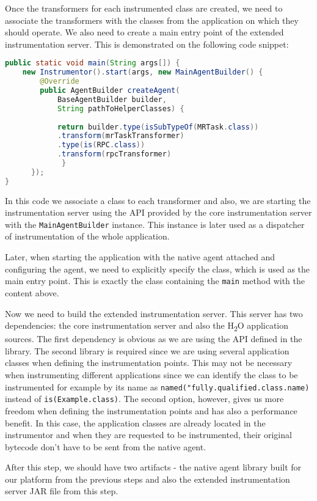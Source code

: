Once the transformers for each instrumented class are created, we need to associate the transformers with the classes from the application on which they should operate. We also need to create a main entry point of the extended instrumentation server. This is demonstrated on the following code snippet:

\begin{lstlisting}[language=Java]
 public static void main(String args[]) {
	new Instrumentor().start(args, new MainAgentBuilder() {
		@Override
		public AgentBuilder createAgent(
			BaseAgentBuilder builder,
			String pathToHelperClasses) {
	 		 
			return builder.type(isSubTypeOf(MRTask.class))
			.transform(mrTaskTransformer)
			.type(is(RPC.class))
			.transform(rpcTransformer)
	         }
	  });
}			 
\end{lstlisting}
In this code we associate a class to each transformer and also, we are starting the instrumentation server using the API provided by the core instrumentation server with the \texttt{MainAgentBuilder} instance. This instance is later used as a dispatcher of instrumentation of the whole application.

Later, when starting the application with the native agent attached and configuring the agent, we need to explicitly specify the class, which is used as the main entry point. This is exactly the class containing the \texttt{main} method with the content above.

Now we need to build the extended instrumentation server. This server has two dependencies: the core instrumentation server and also the H\textsubscript{2}O application sources. The first dependency is obvious as we are using the API defined in the library. The second library is required since we are using several application classes when defining the instrumentation points. This may not be necessary when instrumenting different applications since we can identify the class to be instrumented for example by its name as \texttt{named("fully.qualified.class.name)} instead of \texttt{is(Example.class)}. The second option, however, gives us more freedom when defining the instrumentation points and has also a performance benefit. In this case, the application classes are already located in the instrumentor and when they are requested to be instrumented, their original bytecode don't have to be sent from the native agent. 

After this step, we should have two artifacts - the native agent library built for our platform from the previous steps and also the extended instrumentation server JAR file from this step.

